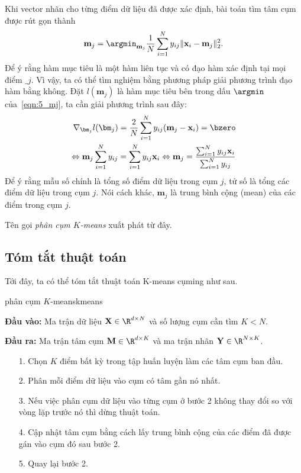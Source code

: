 Khi vector nhãn cho từng điểm dữ liệu đã được xác định, bài toán
tìm tâm cụm được rút gọn thành
\begin{equation}
\label{eqn:5_mj}
\mathbf{m}_j = \argmin_{\mathbf{m}_j} \frac{1}{N}\sum_{i = 1}^{N}
y_{ij}\|\mathbf{x}_i - \mathbf{m}_j \|_2^2.
\end{equation}
Để ý rằng hàm mục tiêu là một hàm liên tục và có đạo hàm xác định tại mọi điểm
$\bm_j$. Vì vậy, ta có thể tìm nghiệm bằng phương pháp giải phương trình đạo hàm
bằng không. Đặt $l(\mathbf{m}_j)$ là hàm mục tiêu bên trong dấu $\argmin$
của~\eqref{eqn:5_mj}, ta cần giải phương trình sau đây:
\begin{eqnarray}
\label{eqn:4_mj2}
\nabla_{\bm_j} l(\bm_j) =  \frac{2}{N}\sum_{i=1}^N
y_{ij}(\mathbf{m}_j - \mathbf{x}_i) = \bzero \\
\Leftrightarrow\mathbf{m}_j \sum_{i=1}^N y_{ij} = \sum_{i=1}^N y_{ij}
\mathbf{x}_i
\Leftrightarrow \mathbf{m}_j = \frac{ \sum_{i=1}^N y_{ij}
\mathbf{x}_i}{\sum_{i=1}^N y_{ij}}
\end{eqnarray}
Để ý rằng mẫu số chính là tổng {số điểm dữ liệu} trong cụm $j$, tử số là
{tổng các điểm dữ liệu} trong cụm $j$. Nói cách khác, $\mathbf{m}_j$
{là trung bình cộng (mean) của các điểm trong cụm} $j$.

Tên gọi \textit{phân cụm $K$-means} xuất phát từ đây.

\subsection{Tóm tắt thuật toán}
Tới đây, ta có thể tóm tắt thuật toán K-means cụming như sau. 
\begin{myalg}{phân cụm $K$-means}{kmeans}
    
\textbf{Đầu vào:} Ma trận dữ liệu $\mathbf{X} \in \R^{d \times N}$ và số lượng
cụm cần tìm $K < N$.

\textbf{Đầu ra:} Ma trận tâm cụm $\mathbf{M} \in \R^{d \times K}$ và ma trận
nhãn $\mathbf{Y} \in \R^{N\times K}$.

\begin{enumerate}
    \item[1.] Chọn $K$ điểm bất kỳ trong tập huấn luyện làm các tâm cụm ban đầu.

    \item[2.]  Phân mỗi điểm dữ liệu vào cụm có tâm gần nó nhất.

    \item[3.]  Nếu việc phân cụm dữ liệu vào từng cụm ở bước 2 không thay đổi
    so với vòng lặp trước nó thì dừng thuật toán.

    \item[4.]  Cập nhật tâm cụm bằng cách lấy trung bình cộng của các điểm đã được gán vào cụm đó sau bước 2.

    \item[5.]  Quay lại bước 2.
\end{enumerate}
\end{myalg}


